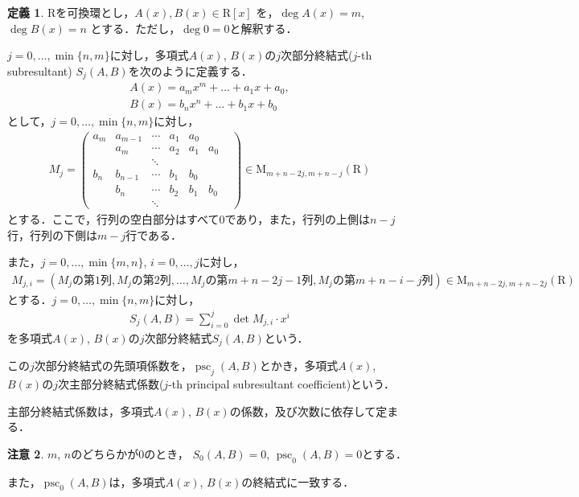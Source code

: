 \documentclass[uplatex, dvipdfmx]{jsarticle}
\numberwithin{equation}{section}
\DeclareMathOperator{\psc}{psc}
\theoremstyle{definition}
\newtheorem{definition}{定義}[section]
\newtheorem{remark}[definition]{注意}
\begin{document}
\begin{definition}
$\mathrm{R}$を可換環とし，$A(x), B(x) \in \mathrm{R}[x]$ を，$\deg A(x) = m$, $\deg B(x) = n$ とする．ただし，$\deg 0 = 0$と解釈する．

$j = 0, \dots, \min\{n, m\}$に対し，多項式$A(x)$, $B(x)$の$j$次部分終結式($j$-th subresultant) $S_j(A, B)$を次のように定義する．
\begin{align}
A(x) = a_m x^m + \dots + a_1 x + a_0, \\
B(x) = b_n x^n + \dots + b_1 x + b_0 
\end{align}
として，$j = 0, \dots, \min\{n,m\}$に対し，
\begin{align}
M_j = 
\begin{pmatrix}
a_m & a_{m-1} & \cdots & a_1 & a_0 &    &  \\
     &  a_m     & \cdots & a_2 & a_1& a_0 &  \\
     &   & \ddots &  & & \\
b_n & b_{n-1} & \cdots & b_1 & b_0 &    & \\
     &  b_n     & \cdots & b_2 & b_1& b_0 & \\
     &   & \ddots &  & & 
\end{pmatrix}
\in \mathrm{M}_{m+n-2j, m+n-j}(\mathrm{R})
\end{align}
とする．ここで，行列の空白部分はすべて$0$であり，また，行列の上側は$n-j$行，行列の下側は$m-j$行である．

また，$j = 0, \dots, \min\{m,n\}$, $i = 0, \dots, j$に対し，
\begin{align}
M_{j,i} = (\text{$M_j$の第$1$列}, \text{$M_j$の第$2$列}, \dots ,\text{$M_j$の第$m+n-2j-1$列}, \text{$M_j$の第$m+n-i-j$列})
\in \mathrm{M}_{m+n-2j, m+n-2j}(\mathrm{R})
\end{align}
とする．$j = 0, \dots, \min\{n, m\}$に対し，
\begin{align}
S_j(A, B) = \sum_{i=0}^j \det M_{j, i} \cdot x^i 
\end{align}
を多項式$A(x)$, $B(x)$の$j$次部分終結式$S_j(A, B)$という．

この$j$次部分終結式の先頭項係数を，$\psc_j(A,B)$とかき，多項式$A(x)$, $B(x)$の$j$次主部分終結式係数($j$-th principal subresultant coefficient)という．
\end{definition}


主部分終結式係数は，多項式$A(x)$, $B(x)$の係数，及び次数に依存して定まる．

\begin{remark}
$m$, $n$のどちらかが$0$のとき，
$S_0(A,B) = 0$, $\psc_0(A,B) = 0$とする．

また，$\psc_0(A,B)$は，多項式$A(x)$, $B(x)$の終結式に一致する．
\end{remark}
\end{document}

